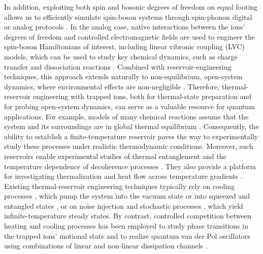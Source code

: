 \documentclass[
reprint,
superscriptaddress,

amsmath,amssymb,
aps,
prl,

floatfix,
]{revtex4-2}
\begin{document}
In addition, exploiting both spin and bosonic degrees of freedom on equal footing allows us to efficiently simulate spin-boson systems through spin-phonon digital \cite{zohreh2021spinphonon,than2025spinphonon} or analog protocols \cite{zahringer2010walk,clos2016thermalization,lv2018rabi,cai2021rabi,mei2022rabihubbard,muralidharan2023jch}. In the analog case, native interactions between the ions’ degrees of freedom and controlled electromagnetic fields are used to engineer the spin-boson Hamiltonians of interest, including linear vibronic coupling (LVC) models, which can be used to study key chemical dynamics, such as charge transfer and dissociation reactions \cite{gorman2018VAET,valahu2023conical,whitlow2023conical,macdonell2023timedomain}.
Combined with reservoir-engineering techniques, this approach extends naturally to non-equilibrium, open-system dynamics, where environmental effects are non-negligible \cite{kang2024chemical,olaya-agudelo2025open,pagano2025varenna}. Therefore, thermal-reservoir engineering with trapped ions, both for thermal-state preparation and for probing open-system dynamics, can serve as a valuable resource for quantum applications. For example, models of many chemical reactions assume that the system and its surroundings are in global thermal equilibrium \cite{laidler1987kinetics,truhlar1996TST,petruccione2007}. Consequently, the ability to establish a finite-temperature reservoir paves the way to experimentally study these processes under realistic thermodynamic conditions. Moreover, such reservoirs enable experimental studies of thermal entanglement and the temperature dependence of decoherence processes \cite{fedortchenko2014finitetemp,wu2017coherence}. They also provide a platform for investigating thermalization and heat flow across temperature gradients \cite{lin2011thermalization}. Existing thermal-reservoir engineering techniques typically rely on cooling processes \cite{poyatos1996cooling,so2024electrontransfer,so2025multimode,kienzler2015thesis,cetina2022cooling}, which pump the system into the vacuum state \cite{Monroe1995a} or into squeezed and entangled states \cite{carvalho2001stateprotect,kienzler2015reservoir,zhu2025dissipation,li2025entanglement}, or on noise injection \cite{myatt2000decoherence,navickas2025chemical} and stochastic processes \cite{sun2025quantum}, which yield infinite-temperature steady states. By contrast, controlled competition between heating and cooling processes has been employed to study phase transitions in the trapped ions’ motional state \cite{behrle2023phononlaser} and to realize quantum van der Pol oscillators using combinations of linear and non-linear dissipation channels \cite{li2025vanderpol}.
\end{document}
